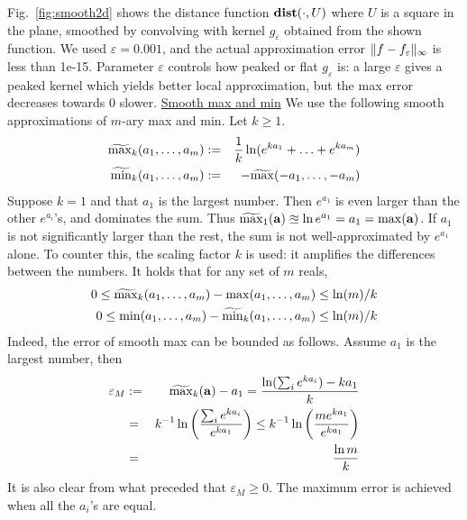 Fig.~\ref{fig:smooth2d} shows the distance function $\mathbf{dist}(\cdot,U)$ where $U$ is a square in the plane, smoothed by convolving with kernel $g_{\varepsilon}$ obtained from the shown function. 
We used $\varepsilon = 0.001$, and the actual approximation error $\|f-f_\varepsilon\|_\infty$ is less than 1e-15.
Parameter $\varepsilon$ controls how peaked or flat $g_\varepsilon$ is: a large $\varepsilon$ gives a peaked kernel which yields better local approximation, but the max error decreases towards 0 slower.
\underline{Smooth max and min}
We use the following smooth approximations of $m$-ary max and min.
Let $k \geq 1$.
\begin{eqnarray}
	\label{eq:soft max min}
	\widetilde{\max}_k(a_1,\ldots,a_m) &:=& \frac{1}{k} \ln(e^{ka_1}+\ldots+e^{ka_m})
	\\
	\widetilde{\min}_k(a_1,\ldots,a_m) &:=& -\widetilde{\max}(-a_1,\ldots,-a_m)
\end{eqnarray}
Suppose $k=1$ and that $a_1$ is the largest number.
Then $e^{a_1}$ is even larger than the other $e^{a_i}$'s, and dominates the sum. 
Thus $\widetilde{\max}_1(\mathbf{a}) \approxeq \ln e^{a_1} = a_1 = \max(\mathbf{a})$.
If $a_1$ is not significantly larger than the rest, the sum is not well-approximated by $e^{a_1}$ alone.
To counter this, the scaling factor $k$ is used: it amplifies the differences between the numbers.
It holds that for any set of $m$ reals,
\begin{eqnarray}
\label{eq:smooth max error}
0 \leq \widetilde{\max}_k(a_1,\ldots,a_m) -\max(a_1,\ldots,a_m) \leq \ln(m)/k
\\
0 \leq \min(a_1,\ldots,a_m) -\widetilde{\min}_k(a_1,\ldots,a_m) \leq \ln(m)/k
\end{eqnarray}
Indeed, the error of smooth max can be bounded as follows.
Assume $a_1$ is the largest number, then 
\begin{eqnarray*}
\varepsilon_M &:=& \widetilde{\max}_k(\mathbf{a}) - a_1 =  \frac{\ln(\sum_ie^{ka_i})-ka_1}{k}
\\
&=& k^{-1}\ln\left(\frac{\sum_ie^{ka_i}}{e^{ka_1}}\right) \leq k^{-1}\ln \left(\frac{me^{ka_1}}{e^{ka_1}}\right)
\\
&=&\frac{\ln m}{k}
\end{eqnarray*}
It is also clear from what preceded that $\varepsilon_M \geq 0$.
The maximum error is achieved when all the $a_i$'s are equal.
